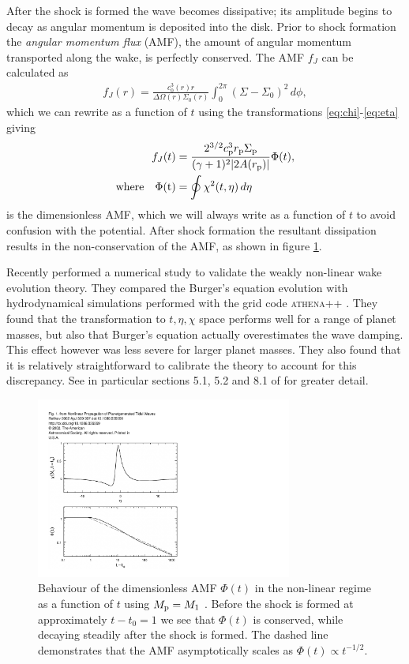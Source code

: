 After the shock is formed the wave becomes dissipative;
its amplitude begins to decay as angular momentum is deposited into the disk.
Prior to shock formation the \textit{angular momentum flux} (AMF), the amount of angular momentum transported along the wake, is perfectly conserved.
The AMF $f_J$ can be calculated as \citep{rafikov2002a}
\begin{align}
    f_J(r) = \frac{c_0^3(r) r}{\Delta\Omega(r)\Sigma_0(r)} \int_0^{2\pi} \left( \Sigma - \Sigma_0 \right)^2 \, d\phi,
\end{align}
which we can rewrite as a function of $t$ using the transformations \ref{eq:chi}-\ref{eq:eta} giving
\begin{align}
    f_J(t) &= \frac{2^{3/2} c_{\rm p}^3 r_{\rm p} \Sigma_{\rm p}}{(\gamma + 1)^2 |2 A(r_{\rm p})|} \Phi(t), \\
    \rm{where} \quad \Phi(t) &= \oint \chi^2(t,\eta) \, d\eta 
\end{align}
is the dimensionless AMF, which we will always write as a function of $t$ to avoid confusion with the potential.
After shock formation the resultant dissipation results in the non-conservation of the AMF, as shown in figure \ref{fig:AMF}.

Recently \citet{cimerman2021} performed a numerical study to validate the weakly non-linear wake evolution theory.
They compared the Burger's equation evolution with hydrodynamical simulations performed with the grid code \textsc{athena++} \citep{stone2020}.
They found that the transformation to $t,\eta,\chi$ space performs well for a range of planet masses, but also that Burger's equation actually overestimates the wave damping.
This effect however was less severe for larger planet masses.
They also found that it is relatively straightforward to calibrate the theory to account for this discrepancy.
See in particular sections 5.1, 5.2 and 8.1 of \citet{cimerman2021} for greater detail.
\begin{figure}
    \centering
    \includegraphics[width = 0.75\textwidth]{figures/AMF_burgers.pdf}
    \caption{Behaviour of the dimensionless AMF $\Phi(t)$ in the non-linear regime as a function of $t$ using $M_{\rm p} = M_1$ \citep[solid line;][]{rafikov2002a}.
    Before the shock is formed at approximately $t-t_0=1$ we see that $\Phi(t)$ is conserved, while decaying steadily after the shock is formed.
    The dashed line demonstrates that the AMF asymptotically scales as $\Phi(t) \propto t^{-1/2}$.
    }
    \label{fig:AMF}
\end{figure}

